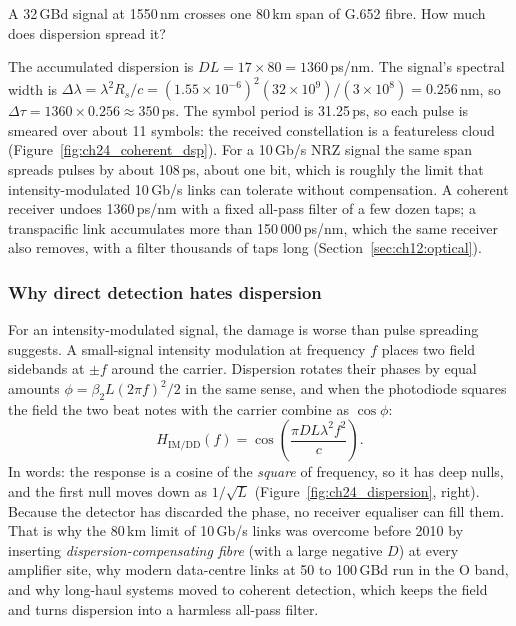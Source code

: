 \begin{worked}
A 32\,GBd signal at 1550\,nm crosses one 80\,km span of G.652 fibre. How much does dispersion spread it?

The accumulated dispersion is $DL=17\times80=1360$\,ps/nm. The signal's spectral width is
$\Delta\lambda=\lambda^2R_s/c=(1.55\times10^{-6})^2(32\times10^9)/(3\times10^8)=0.256$\,nm, so
$\Delta\tau=1360\times0.256\approx350$\,ps. The symbol period is 31.25\,ps, so each pulse is smeared over
about 11 symbols: the received constellation is a featureless cloud (Figure~\ref{fig:ch24_coherent_dsp}).
For a 10\,Gb/s NRZ signal the same span spreads pulses by about 108\,ps, about one bit, which is roughly
the limit that intensity-modulated 10\,Gb/s links can tolerate without compensation. A coherent receiver
undoes 1360\,ps/nm with a fixed all-pass filter of a few dozen taps; a transpacific link accumulates
more than 150\,000\,ps/nm, which the same receiver also removes, with a filter thousands of taps long
(Section~\ref{sec:ch12:optical}).
\end{worked}



\subsubsection{Why direct detection hates dispersion}

For an intensity-modulated signal, the damage is worse than pulse spreading suggests. A small-signal
intensity modulation at frequency $f$ places two field sidebands at $\pm f$ around the carrier. Dispersion
rotates their phases by equal amounts $\phi=\beta_2L(2\pi f)^2/2$ in the same sense, and when the
photodiode squares the field the two beat notes with the carrier combine as $\cos\phi$:
\begin{equation}
H_{\mathrm{IM/DD}}(f)=\cos\!\left(\frac{\pi D L\lambda^2f^2}{c}\right).
\label{eq:ch24:fading}
\end{equation}
In words: the response is a cosine of the \emph{square} of frequency, so it has deep nulls, and the
first null moves down as $1/\sqrt{L}$ (Figure~\ref{fig:ch24_dispersion}, right). Because the detector
has discarded the phase, no receiver equaliser can fill them. That is why the 80\,km limit of 10\,Gb/s
links was overcome before 2010 by inserting \emph{dispersion-compensating fibre} (with a large negative
$D$) at every amplifier site, why modern data-centre links at 50 to 100\,GBd run in the O band, and why
long-haul systems moved to coherent detection, which keeps the field and turns dispersion into a
harmless all-pass filter.

